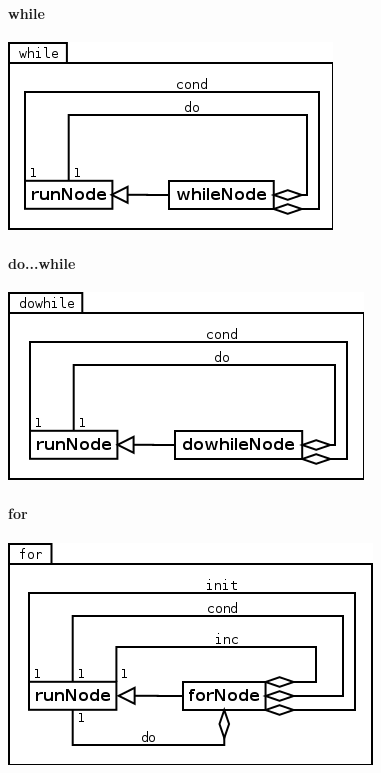 \paragraph{while}
\begin{center}
\includegraphics[scale=0.4]{while.png} \\
\end{center}


\paragraph{do...while}
\begin{center}
\includegraphics[scale=0.4]{dowhile.png} \\
\end{center}

\paragraph{for}
\begin{center}
\includegraphics[scale=0.4]{for.png} \\
\end{center}

